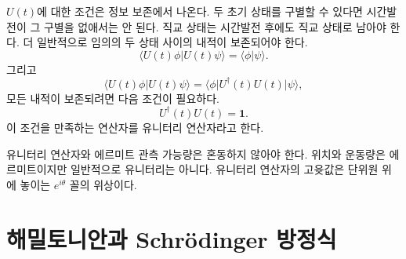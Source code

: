 \(U(t)\)에 대한 조건은 정보 보존에서 나온다. 두 초기 상태를 구별할 수 있다면 시간발전이 그 구별을 없애서는 안 된다. 직교 상태는 시간발전 후에도 직교 상태로 남아야 한다. 더 일반적으로 임의의 두 상태 사이의 내적이 보존되어야 한다.
\begin{equation}
\langle U(t)\phi|U(t)\psi\rangle
=\langle\phi|\psi\rangle.
\end{equation}
그리고
\begin{equation}
\langle U(t)\phi|U(t)\psi\rangle
=\langle\phi|U^\dagger(t)U(t)|\psi\rangle,
\end{equation}
모든 내적이 보존되려면 다음 조건이 필요하다.
\begin{equation}
U^\dagger(t)U(t)=\mathbf 1.
\end{equation}
이 조건을 만족하는 연산자를 유니터리 연산자라고 한다.

\begin{classroomqa}
\end{classroomqa}


유니터리 연산자와 에르미트 관측 가능량은 혼동하지 않아야 한다. 위치와 운동량은 에르미트이지만 일반적으로 유니터리는 아니다. 유니터리 연산자의 고윳값은 단위원 위에 놓이는 \(e^{i\theta}\) 꼴의 위상이다.

\begin{classroomqa}
\end{classroomqa}

\section{해밀토니안과 Schr\"odinger 방정식}

